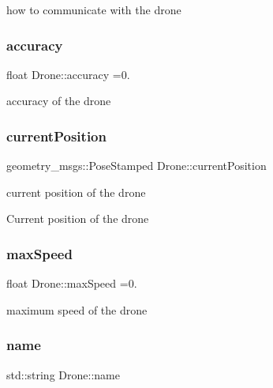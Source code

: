 how to communicate with the drone \mbox{\label{classDrone_afbbc1d4b668c6d5021344f0578c12973}} 
\subsubsection{\texorpdfstring{accuracy}{accuracy}}
{\footnotesize\ttfamily float Drone\+::accuracy =0.\hspace{0.3cm}{\ttfamily [protected]}}

accuracy of the drone \mbox{\label{classDrone_a190e4f63bb9a0e5b4f822fc87f2185f9}} 
\subsubsection{\texorpdfstring{current\+Position}{currentPosition}}
{\footnotesize\ttfamily geometry\+\_\+msgs\+::\+Pose\+Stamped Drone\+::current\+Position\hspace{0.3cm}{\ttfamily [protected]}}

current position of the drone

Current position of the drone \mbox{\label{classDrone_a915ef72b30c96172ff8f295cbb7f47d4}} 
\subsubsection{\texorpdfstring{max\+Speed}{maxSpeed}}
{\footnotesize\ttfamily float Drone\+::max\+Speed =0.\hspace{0.3cm}{\ttfamily [protected]}}

maximum speed of the drone \mbox{\label{classDrone_ac5f6c269378659247acd057142542013}} 
\subsubsection{\texorpdfstring{name}{name}}
{\footnotesize\ttfamily std\+::string Drone\+::name\hspace{0.3cm}{\ttfamily [protected]}}

